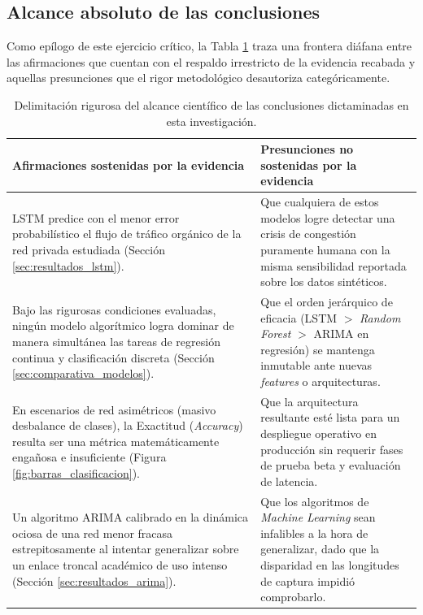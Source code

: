 \documentclass[12pt]{report}
\begin{document}
\subsection*{Alcance absoluto de las conclusiones}

Como epílogo de este ejercicio crítico, la Tabla \ref{tab:alcance_conclusiones} traza una frontera diáfana entre las afirmaciones que cuentan con el respaldo irrestricto de la evidencia recabada y aquellas presunciones que el rigor metodológico desautoriza categóricamente.

\begin{table}[H]
    \centering
    \small
    \begin{tabular}{|p{6.4cm}|p{6.4cm}|}
        \hline
        \textbf{Afirmaciones sostenidas por la evidencia} & \textbf{Presunciones no sostenidas por la evidencia} \\
        \hline
        LSTM predice con el menor error probabilístico el flujo de tráfico orgánico de la red privada estudiada (Sección \ref{sec:resultados_lstm}). & Que cualquiera de estos modelos logre detectar una crisis de congestión puramente humana con la misma sensibilidad reportada sobre los datos sintéticos. \\
        \hline
        Bajo las rigurosas condiciones evaluadas, ningún modelo algorítmico logra dominar de manera simultánea las tareas de regresión continua y clasificación discreta (Sección \ref{sec:comparativa_modelos}). & Que el orden jerárquico de eficacia (LSTM $>$ \textit{Random Forest} $>$ ARIMA en regresión) se mantenga inmutable ante nuevas \textit{features} o arquitecturas. \\
        \hline
        En escenarios de red asimétricos (masivo desbalance de clases), la Exactitud (\textit{Accuracy}) resulta ser una métrica matemáticamente engañosa e insuficiente (Figura \ref{fig:barras_clasificacion}). & Que la arquitectura resultante esté lista para un despliegue operativo en producción sin requerir fases de prueba beta y evaluación de latencia. \\
        \hline
        Un algoritmo ARIMA calibrado en la dinámica ociosa de una red menor fracasa estrepitosamente al intentar generalizar sobre un enlace troncal académico de uso intenso (Sección \ref{sec:resultados_arima}). & Que los algoritmos de \textit{Machine Learning} sean infalibles a la hora de generalizar, dado que la disparidad en las longitudes de captura impidió comprobarlo. \\
        \hline
    \end{tabular}
    \caption{Delimitación rigurosa del alcance científico de las conclusiones dictaminadas en esta investigación.}
    \label{tab:alcance_conclusiones}
\end{table}
\end{document}
